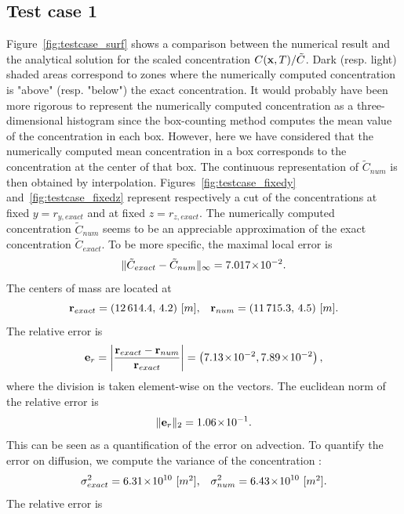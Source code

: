 \subsection{Test case 1}
Figure~\ref{fig:testcase_surf} shows a comparison between the numerical result and the analytical solution for the scaled concentration $C(\mathbf x,T)/\tilde C$. Dark (resp. light) shaded areas correspond to zones where the numerically computed concentration is "above" (resp. "below") the exact concentration. It would probably have been more rigorous to represent the numerically computed concentration as a three-dimensional histogram since the box-counting method computes the mean value of the concentration in each box. However, here we have considered that the numerically computed mean concentration in a box corresponds to the concentration at the center of that box. The continuous representation of $\tilde{C}_{num}$ is then obtained by interpolation. Figures~\ref{fig:testcase_fixedy} and~\ref{fig:testcase_fixedz} represent respectively a cut of the concentrations at fixed $y = r_{y,exact}$ and at fixed $z = r_{z,exact}$. The numerically computed concentration $\tilde C_{num}$ seems to be an appreciable approximation of the exact concentration $\tilde C_{exact}$. To be more specific, the maximal local error is 
\begin{equation}
	\|\tilde C_{exact}- \tilde C_{num}\|_{\infty} = 7.017\!\times\!10^{-2}.
\end{equation}
The centers of mass are located at
\begin{equation}
	\mathbf r_{exact} = (12\,614.4,\,4.2) \mbox{ [$m$],}\quad \mathbf r_{num} = (11\,715.3,\,4.5) \mbox{ [$m$]}.
\end{equation}
The relative error is
\begin{equation}
	\mathbf e_r = \left \lvert \frac{\mathbf r_{exact}-\mathbf r_{num}}{\mathbf r_{exact}} \right \rvert =  \left(7.13\!\times\!10^{-2}, 7.89\!\times\!10^{-2}\right),
\end{equation}
where the division is taken element-wise on the vectors. The euclidean norm of the relative error is
\begin{equation}
	\| \mathbf e_r \|_2 = 1.06\!\times\!10^{-1}.
\end{equation}
This can be seen as a quantification of the error on advection. To quantify the error on diffusion, we compute the variance of the concentration :
\begin{equation}
	\sigma^2_{exact} = 6.31\!\times\!10^{10} \mbox{ [$m^2$],}\quad \sigma^2_{num} = 6.43\!\times\!10^{10} \mbox{ [$m^2$].}
\end{equation}
The relative error is
